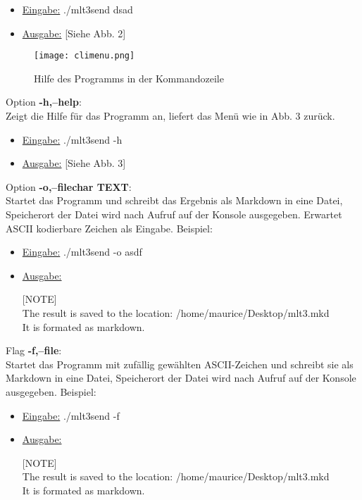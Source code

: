 \documentclass{article}
\begin{document}
\begin{itemize}
	\item \underline{Eingabe:} ./mlt3send dsad
	\item \underline{Ausgabe:} [Siehe Abb. 2]\\
\end{itemize}

\begin{center}
\begin{figure}[h]
    \centering
    \texttt{[image: climenu.png]}
    \caption{Hilfe des Programms in der Kommandozeile}
\end{figure}
\end{center}

Option \textbf{-h,--help}:\\
Zeigt die Hilfe für das Programm an, liefert das Menü wie in Abb. 3 zurück.
\begin{itemize}
	\item \underline{Eingabe:} ./mlt3send -h
	\item \underline{Ausgabe:} [Siehe Abb. 3]\\
\end{itemize}

Option \textbf{-o,--filechar TEXT}:\\
Startet das Programm und schreibt das Ergebnis als Markdown in eine Datei, Speicherort der Datei wird nach Aufruf auf der Konsole ausgegeben.
Erwartet ASCII kodierbare Zeichen als Eingabe.
Beispiel: 
\begin{itemize}
	\item \underline{Eingabe:} ./mlt3send -o asdf
	\item \underline{Ausgabe:}

[NOTE]\\
The result is saved to the location: /home/maurice/Desktop/mlt3.mkd\\
It is formated as markdown.\\
\end{itemize}

Flag \textbf{-f,--file}:\\
Startet das Programm mit zufällig gewählten ASCII-Zeichen und schreibt sie als Markdown in eine Datei, Speicherort der Datei wird nach Aufruf auf der Konsole ausgegeben.
Beispiel: 
\begin{itemize}
	\item \underline{Eingabe:} ./mlt3send -f
	\item \underline{Ausgabe:}

[NOTE]\\
The result is saved to the location: /home/maurice/Desktop/mlt3.mkd\\
It is formated as markdown.\\
\end{itemize}
\end{document}
